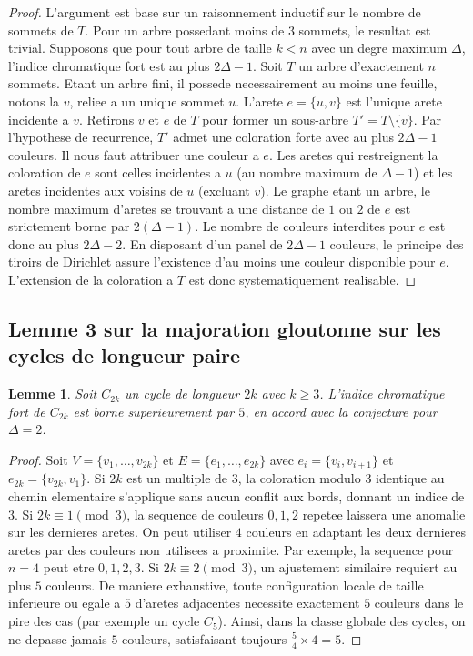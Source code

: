 \documentclass[11pt,a4paper]{article}
\newtheorem{lemma}[theorem]{Lemme}
\begin{document}
\begin{proof}
L'argument est base sur un raisonnement inductif sur le nombre de sommets de $T$. Pour un arbre possedant moins de $3$ sommets, le resultat est trivial.
Supposons que pour tout arbre de taille $k < n$ avec un degre maximum $\Delta$, l'indice chromatique fort est au plus $2\Delta - 1$. Soit $T$ un arbre d'exactement $n$ sommets. Etant un arbre fini, il possede necessairement au moins une feuille, notons la $v$, reliee a un unique sommet $u$. L'arete $e = \{u, v\}$ est l'unique arete incidente a $v$. Retirons $v$ et $e$ de $T$ pour former un sous-arbre $T' = T \setminus \{v\}$.
Par l'hypothese de recurrence, $T'$ admet une coloration forte avec au plus $2\Delta - 1$ couleurs. Il nous faut attribuer une couleur a $e$. Les aretes qui restreignent la coloration de $e$ sont celles incidentes a $u$ (au nombre maximum de $\Delta - 1$) et les aretes incidentes aux voisins de $u$ (excluant $v$). Le graphe etant un arbre, le nombre maximum d'aretes se trouvant a une distance de $1$ ou $2$ de $e$ est strictement borne par $2(\Delta - 1)$.
Le nombre de couleurs interdites pour $e$ est donc au plus $2\Delta - 2$. En disposant d'un panel de $2\Delta - 1$ couleurs, le principe des tiroirs de Dirichlet assure l'existence d'au moins une couleur disponible pour $e$. L'extension de la coloration a $T$ est donc systematiquement realisable.
\end{proof}

\subsection{Lemme 3 sur la majoration gloutonne sur les cycles de longueur paire}

\begin{lemma}
Soit $C_{2k}$ un cycle de longueur $2k$ avec $k \geq 3$. L'indice chromatique fort de $C_{2k}$ est borne superieurement par $5$, en accord avec la conjecture pour $\Delta = 2$.
\end{lemma}

\begin{proof}
Soit $V = \{v_1, \dots, v_{2k}\}$ et $E = \{e_1, \dots, e_{2k}\}$ avec $e_i = \{v_i, v_{i+1}\}$ et $e_{2k} = \{v_{2k}, v_1\}$.
Si $2k$ est un multiple de $3$, la coloration modulo $3$ identique au chemin elementaire s'applique sans aucun conflit aux bords, donnant un indice de $3$.
Si $2k \equiv 1 \pmod 3$, la sequence de couleurs $0, 1, 2$ repetee laissera une anomalie sur les dernieres aretes. On peut utiliser $4$ couleurs en adaptant les deux dernieres aretes par des couleurs non utilisees a proximite. Par exemple, la sequence pour $n=4$ peut etre $0, 1, 2, 3$.
Si $2k \equiv 2 \pmod 3$, un ajustement similaire requiert au plus $5$ couleurs. De maniere exhaustive, toute configuration locale de taille inferieure ou egale a $5$ d'aretes adjacentes necessite exactement $5$ couleurs dans le pire des cas (par exemple un cycle $C_5$). Ainsi, dans la classe globale des cycles, on ne depasse jamais $5$ couleurs, satisfaisant toujours $\frac{5}{4} \times 4 = 5$.
\end{proof}
\end{document}
